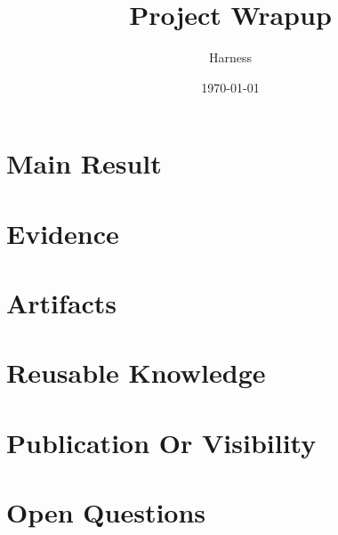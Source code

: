 \documentclass[11pt]{article}
\title{Project Wrapup}
\author{Harness}
\date{\today}
\begin{document}
\maketitle

\section{Main Result}

\section{Evidence}

\section{Artifacts}

\section{Reusable Knowledge}

\section{Publication Or Visibility}

\section{Open Questions}
\end{document}

